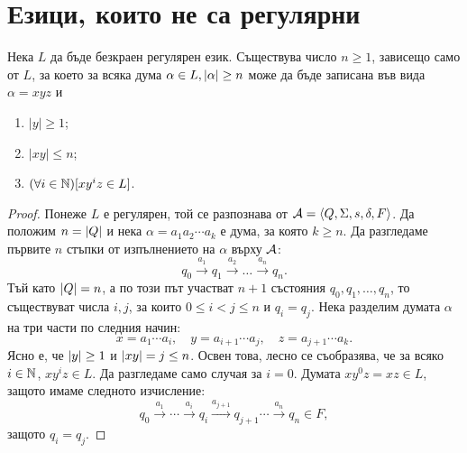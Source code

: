 \section{Езици, които не са регулярни}
\begin{lemma}
  \label{lem:pumping-reg}
  Нека $L$ да бъде безкраен регулярен език.
  Съществува число $n\geq 1$, зависещо само от $L$, 
  за което за всяка дума $\alpha\in L, \lvert{\alpha}\rvert\geq n$ може да 
  бъде записана във вида $\alpha = xyz$ и 
  \begin{enumerate}[1)]
  \item
    $|y|\geq 1$;
  \item
    $|xy|\leq n$;
  \item
    $(\forall i\in\mathbb{N})[xy^iz \in L]$.
  \end{enumerate}
\end{lemma}
\begin{proof}
  Понеже $L$ е регулярен, той се разпознава от $\mathcal{A} = \langle{Q,\Sigma,s,\delta,F}\rangle$.
  Да положим $n = \lvert{Q}\rvert$ и нека $\alpha = a_1a_2\cdots a_k$ е дума, за която $k \geq n$.
  Да разгледаме първите $n$ стъпки от изпълнението на $\alpha$ върху $\mathcal{A}$:
  \[q_0\stackrel{a_1}{\rightarrow} q_1 \stackrel{a_2}{\rightarrow} \dots \stackrel{a_n}{\rightarrow} q_n.\]
  Тъй като $\lvert{Q}\rvert = n$, а по този път участват $n+1$ състояния $q_0,q_1,\dots,q_n$,
  то съществуват числа $i, j$, за които $0\leq i < j\leq n$ и $q_i = q_j$.
  Нека разделим думата $\alpha$ на три части по следния начин:
  \[x = a_1\cdots a_i,\quad y = a_{i+1}\cdots a_j,\quad z = a_{j+1}\cdots a_k.\]
  Ясно е, че $\lvert{y}\rvert \geq 1$ и $\lvert{xy}\rvert = j \leq n$.
  Освен това, лесно се съобразява, че за всяко $i \in\mathbb{N}$,
  $xy^iz \in L$. Да разгледаме само случая за $i = 0$.
  Думата $xy^0z = xz \in L$, защото имаме следното изчисление:
  \[q_0\stackrel{a_1}{\rightarrow} \cdots \stackrel{a_i}{\rightarrow} q_i\stackrel{a_{j+1}}{\rightarrow}q_{j+1}\cdots\stackrel{a_{n}}{\rightarrow}q_n\in F,\]
  защото $q_i = q_j$.
\end{proof}

